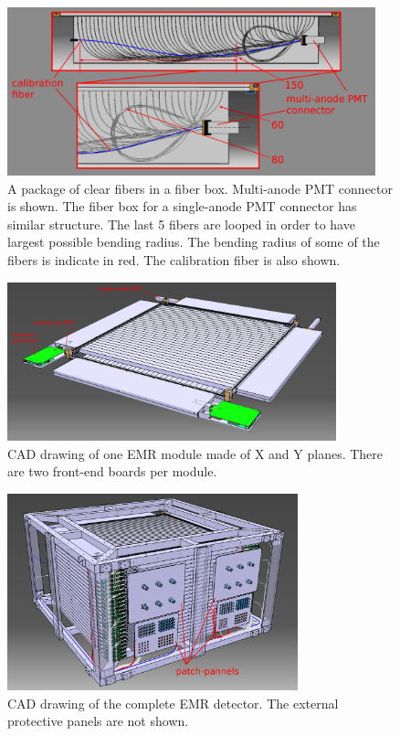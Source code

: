 \documentclass[a4paper,11pt]{article}
\begin{document}
\begin{figure}[ht]
 \centering
 \includegraphics[width=0.95\textwidth]{./clear_fiber_package}
 \caption[A package of clear fibers in a fiber box]{ A package of clear fibers in a fiber box. Multi-anode PMT connector is shown.
 The fiber box for a single-anode PMT connector has similar structure. The last 5 fibers are looped in order to have largest possible
 bending radius. The bending radius of some of the fibers is indicate in red. The calibration fiber is also shown. }
 \label{fig:clear_fiber_package}
\end{figure}

\begin{figure}[htb]
 \centering
 \includegraphics[width=0.85\textwidth]{./emr_module}
 \caption[CAD drawing of one EMR module]{CAD drawing of one EMR module made of X and Y planes. There are two front-end boards per module.}
 \label{fig:emr_module}
\end{figure}
\begin{figure}[htp!]
 \centering
 \includegraphics[width=0.75\textwidth]{./emr_cad_model_1}
 \caption[CAD drawing of the EMR detector]{CAD drawing of the complete EMR detector. The external protective panels are not shown.}
 \label{fig:emr_full_cad_model}
\end{figure}
\end{document}
